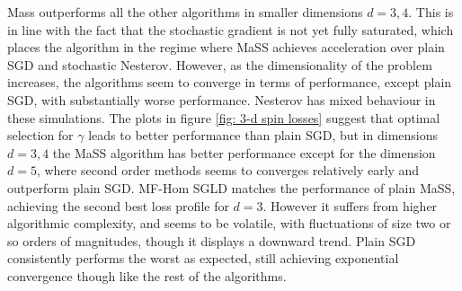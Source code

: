 \documentclass{article}
\theoremstyle{mystyle}
\begin{document}
Mass outperforms all the other algorithms in smaller dimensions $ d=3, 4$. This is in line with the fact that the stochastic gradient is not yet fully saturated, which places the algorithm in the regime where MaSS achieves acceleration over plain SGD and stochastic Nesterov. However, as the dimensionality of the problem increases, the algorithms seem to converge in terms of performance, except plain SGD, with substantially worse performance. Nesterov has mixed behaviour in these simulations. The plots in figure \ref{fig: 3-d spin losses} suggest that optimal selection for $ \gamma$ leads to better performance than plain SGD, but in dimensions $ d=3, 4$ the MaSS algorithm has better performance except for the dimension $ d=5$, where second order methods seems to converges relatively early and outperform plain SGD. MF-Hom SGLD matches the performance of plain MaSS, achieving the second best loss profile for $ d=3$. However it suffers from higher algorithmic complexity, and seems to be volatile, with fluctuations of size two or so orders of magnitudes, though it displays a downward trend. Plain SGD consistently performs the worst as expected, still achieving exponential convergence though like the rest of the algorithms. \\
\end{document}
